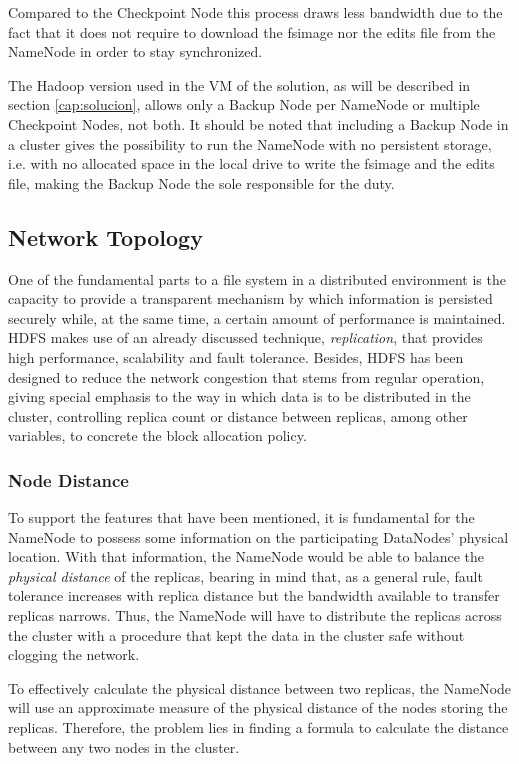 Compared to the Checkpoint Node this process draws less bandwidth due to the fact that it does not require to download the fsimage nor the edits file from the NameNode in order to stay synchronized.

The Hadoop version used in the VM of the solution, as will be described in section \ref{cap:solucion}, allows only a Backup Node per NameNode or multiple Checkpoint Nodes, not both. It should be noted that including a Backup Node in a cluster gives the possibility to run the NameNode with no persistent storage, i.e. with no allocated space in the local drive to write the fsimage and the edits file, making the Backup Node the sole responsible for the duty.

\subsection{Network Topology}\label{subsec:topologiared}
\noindent One of the fundamental parts to a file system in a distributed environment is the capacity to provide a transparent mechanism by which information is persisted securely while, at the same time, a certain amount of performance is maintained. HDFS makes use of an already discussed technique, \emph{replication}, that provides high performance, scalability and fault tolerance. Besides, HDFS has been designed to reduce the network congestion that stems from regular operation, giving special emphasis to the way in which data is to be distributed in the cluster, controlling replica count or distance between replicas, among other variables, to concrete the block allocation policy.

\subsubsection{Node Distance}\label{subsubsec:distnodos}
\noindent To support the features that have been mentioned, it is fundamental for the NameNode to possess some information on the participating DataNodes' physical location. With that information, the NameNode would be able to balance the \emph{physical distance} of the replicas, bearing in mind that, as a general rule, fault tolerance increases with replica distance but the bandwidth available to transfer replicas narrows. Thus, the NameNode will have to distribute the replicas across the cluster with a procedure that kept the data in the cluster safe without clogging the network.

To effectively calculate the physical distance between two replicas, the NameNode will use an approximate measure of the physical distance of the nodes storing the replicas. Therefore, the problem lies in finding a formula to calculate the distance between any two nodes in the cluster.

